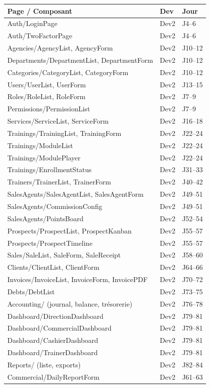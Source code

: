 \documentclass[12pt,a4paper]{report}
\begin{document}
\begin{longtable}{L{6cm} L{3cm} L{5cm}}
    \toprule
    \textbf{Page / Composant} & \textbf{Dev} & \textbf{Jour} \\
    \midrule
    \endhead
    Auth/LoginPage & Dev2 & J4--6 \\
    Auth/TwoFactorPage & Dev2 & J4--6 \\
    Agencies/AgencyList, AgencyForm & Dev2 & J10--12 \\
    Departments/DepartmentList, DepartmentForm & Dev2 & J10--12 \\
    Categories/CategoryList, CategoryForm & Dev2 & J10--12 \\
    Users/UserList, UserForm & Dev2 & J13--15 \\
    Roles/RoleList, RoleForm & Dev2 & J7--9 \\
    Permissions/PermissionList & Dev2 & J7--9 \\
    Services/ServiceList, ServiceForm & Dev2 & J16--18 \\
    Trainings/TrainingList, TrainingForm & Dev2 & J22--24 \\
    Trainings/ModuleList & Dev2 & J22--24 \\
    Trainings/ModulePlayer & Dev2 & J22--24 \\
    Trainings/EnrollmentStatus & Dev2 & J31--33 \\
    Trainers/TrainerList, TrainerForm & Dev2 & J40--42 \\
    SalesAgents/SalesAgentList, SalesAgentForm & Dev2 & J49--51 \\
    SalesAgents/CommissionConfig & Dev2 & J49--51 \\
    SalesAgents/PointsBoard & Dev2 & J52--54 \\
    Prospects/ProspectList, ProspectKanban & Dev2 & J55--57 \\
    Prospects/ProspectTimeline & Dev2 & J55--57 \\
    Sales/SaleList, SaleForm, SaleReceipt & Dev2 & J58--60 \\
    Clients/ClientList, ClientForm & Dev2 & J64--66 \\
    Invoices/InvoiceList, InvoiceForm, InvoicePDF & Dev2 & J70--72 \\
    Debts/DebtList & Dev2 & J73--75 \\
    Accounting/ (journal, balance, trésorerie) & Dev2 & J76--78 \\
    Dashboard/DirectionDashboard & Dev2 & J79--81 \\
    Dashboard/CommercialDashboard & Dev2 & J79--81 \\
    Dashboard/CashierDashboard & Dev2 & J79--81 \\
    Dashboard/TrainerDashboard & Dev2 & J79--81 \\
    Reports/ (liste, exports) & Dev2 & J82--84 \\
    Commercial/DailyReportForm & Dev2 & J61--63 \\
    \bottomrule
\end{longtable}
\end{document}
